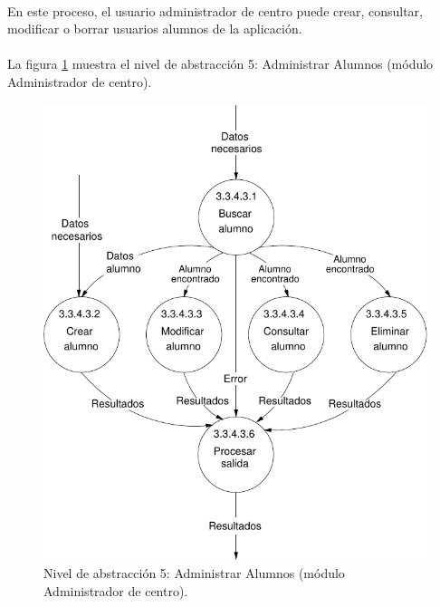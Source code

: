 \paragraph{}En este proceso, el usuario administrador de centro puede crear,
consultar, modificar o borrar usuarios alumnos de la aplicación.

\paragraph{}La figura \ref{diagramaNivel5-AdministrarAlumnos-admCentro}
muestra el nivel de abstracción 5: Administrar Alumnos (módulo Administrador
de centro).

  \begin{figure}[!ht]
    \begin{center}
      \includegraphics[]{08.Analisis_Funcional/8.2.DFDs/Niveles/Nivel5/AdministradorCentro/AdministrarUsuarios/AdministrarAlumnos/Diagramas/nivel5-AdministrarAlumnos.pdf}
      \caption{Nivel de abstracción 5: Administrar Alumnos (módulo
      Administrador de centro).}
      \label{diagramaNivel5-AdministrarAlumnos-admCentro}
    \end{center}
  \end{figure}

